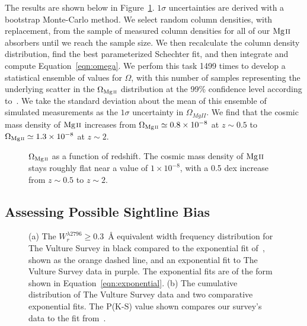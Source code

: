 \documentclass[iop,apj,numberedappendix,appendixfloats,twocolappendix]{emulateapj}
\begin{document}
The results are shown below in Figure~\ref{fig:omegamgii}. $1\sigma$ uncertainties are derived with a bootstrap Monte-Carlo method. We select random column densities, with replacement, from the sample of measured column densities for all of our ${\hbox{{\rm Mg}\kern 0.1em{\sc ii}}}$ absorbers until we reach the sample size. We then recalculate the column density distribution, find the best parameterized Schechter fit, and then integrate and compute Equation~\ref{eqn:omega}. We perfom this task 1499 times to develop a statistical ensemble of values for $\Omega$, with this number of samples representing the underlying scatter in the $\Omega_{\hbox{\scriptsize {\MgII}}}$ distribution at the 99\% confidence level according to~\cite{Davidson2000bootstrap}. We take the standard deviation about the mean of this ensemble of simulated measurements as the $1\sigma$ uncertainty in $\Omega_{MgII}$. We find that the cosmic mass density of ${\hbox{{\rm Mg}\kern 0.1em{\sc ii}}}$ increases from $\Omega_{\hbox{\scriptsize {\MgII}}} \simeq 0.8\times10^{-8}$ at $z \sim 0.5$ to $\Omega_{\hbox{\scriptsize {\MgII}}} \simeq 1.3\times10^{-8}$ at $z \sim 2$.

\begin{figure}[bth]
\caption{$\Omega_{\hbox{\scriptsize {\MgII}}}$ as a function of redshift. The cosmic mass density of ${\hbox{{\rm Mg}\kern 0.1em{\sc ii}}}$ stays roughly flat near a value of $1 \times 10^{-8}$, with a 0.5 dex increase from $z \sim 0.5$ to $z \sim 2$.}
\label{fig:omegamgii}
\end{figure}

\subsection{Assessing Possible Sightline Bias}
\label{sec:bias}

\begin{figure*}[bth]
\caption{(a) The $W_r^{\lambda2796} \ge 0.3$~{\AA} equivalent width frequency distribution for The Vulture Survey in black compared to the exponential fit of~\cite{Nestor2005}, shown as the orange dashed line, and an exponential fit to The Vulture Survey data in purple. The exponential fits are of the form shown in Equation~\ref{eqn:exponential}. (b) The cumulative distribution of The Vulture Survey data and two comparative exponential fits. The P(K-S) value shown compares our survey's data to the fit from~\cite{Nestor2005}. }
\label{fig:bias}
\end{figure*}
\end{document}
